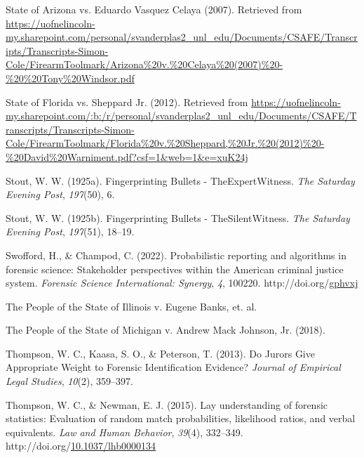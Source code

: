\documentclass[print]{nuthesis}
\newlength{\cslhangindent}
\newenvironment{CSLReferences}[2]%
{\setlength{\parindent}{0pt}%
\everypar{\setlength{\hangindent}{\cslhangindent}}\ignorespaces}%
{\par}
\begin{document}
\begin{CSLReferences}{1}{0}
\leavevmode{}%
State of {Arizona} vs. Eduardo {Vasquez} {Celaya} (2007). Retrieved from \url{https://uofnelincoln-my.sharepoint.com/personal/svanderplas2_unl_edu/Documents/CSAFE/Transcripts/Transcripts-Simon-Cole/FirearmToolmark/Arizona\%20v.\%20Celaya\%20(2007)\%20-\%20\%20Tony\%20Windsor.pdf}

\leavevmode{}%
State of {Florida} vs. Sheppard {Jr.} (2012). Retrieved from \url{https://uofnelincoln-my.sharepoint.com/:b:/r/personal/svanderplas2_unl_edu/Documents/CSAFE/Transcripts/Transcripts-Simon-Cole/FirearmToolmark/Florida\%20v.\%20Sheppard,\%20Jr.\%20(2012)\%20-\%20David\%20Warniment.pdf?csf=1\&web=1\&e=xuK24j}

\leavevmode{}%
Stout, W. W. (1925a). {Fingerprinting} {Bullets} - {The}{Expert}{Witness}. \emph{The {Saturday} {Evening} {Post}}, \emph{197}(50), 6.

\leavevmode{}%
Stout, W. W. (1925b). {Fingerprinting} {Bullets} - {The}{Silent}{Witness}. \emph{The {Saturday} {Evening} {Post}}, \emph{197}(51), 18--19.

\leavevmode{}%
Swofford, H., \& Champod, C. (2022). Probabilistic reporting and algorithms in forensic science: {Stakeholder} perspectives within the {American} criminal justice system. \emph{Forensic Science International: Synergy}, \emph{4}, 100220. http://doi.org/\href{https://doi.org/gphvxj}{gphvxj}

\leavevmode{}%
The {People} of the {State} of {Illinois} v. Eugene {Banks}, et. al.

\leavevmode{}%
The {People} of the {State} of {Michigan} v. Andrew {Mack} {Johnson}, {Jr.} (2018).

\leavevmode{}%
Thompson, W. C., Kaasa, S. O., \& Peterson, T. (2013). Do {Jurors} {Give} {Appropriate} {Weight} to {Forensic} {Identification} {Evidence}? \emph{Journal of Empirical Legal Studies}, \emph{10}(2), 359--397.

\leavevmode{}%
Thompson, W. C., \& Newman, E. J. (2015). Lay understanding of forensic statistics: {Evaluation} of random match probabilities, likelihood ratios, and verbal equivalents. \emph{Law and Human Behavior}, \emph{39}(4), 332--349. http://doi.org/\href{https://doi.org/10.1037/lhb0000134}{10.1037/lhb0000134}


\end{CSLReferences}
\end{document}
